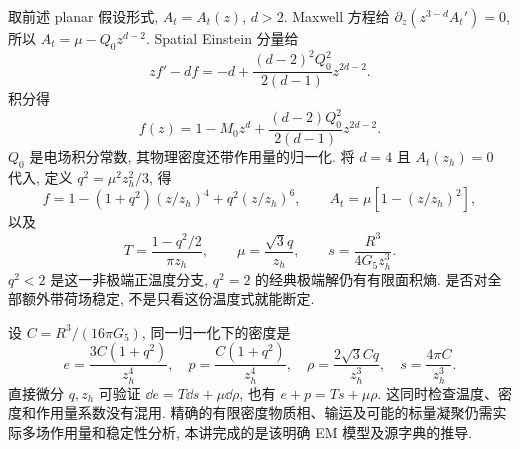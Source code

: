 取前述 planar 假设形式, $A_t=A_t(z)$, $d>2$. Maxwell 方程给 $\partial_z(z^{3-d}A_t')=0$, 所以 $A_t=\mu-Q_0z^{d-2}$. Spatial Einstein 分量给
\[
zf'-df=-d+\frac{(d-2)^2Q_0^2}{2(d-1)}z^{2d-2}.
\]
积分得
\[
f(z)=1-M_0z^d+\frac{(d-2)Q_0^2}{2(d-1)}z^{2d-2}.
\]
$Q_0$ 是电场积分常数, 其物理密度还带作用量的归一化. 将 $d=4$ 且 $A_t(z_h)=0$ 代入, 定义 $q^2=\mu^2z_h^2/3$, 得
\[
f=1-(1+q^2)(z/z_h)^4+q^2(z/z_h)^6,
\qquad A_t=\mu[1-(z/z_h)^2],
\]
以及
\[
T=\frac{1-q^2/2}{\pi z_h},\qquad
\mu=\frac{\sqrt3q}{z_h},\qquad
s=\frac{R^3}{4G_5z_h^3}.
\]
$q^2<2$ 是这一非极端正温度分支, $q^2=2$ 的经典极端解仍有有限面积熵. 是否对全部额外带荷场稳定, 不是只看这份温度式就能断定.

设 $C=R^3/(16\pi G_5)$, 同一归一化下的密度是
\[
e=\frac{3C(1+q^2)}{z_h^4},\quad
p=\frac{C(1+q^2)}{z_h^4},\quad
\rho=\frac{2\sqrt3Cq}{z_h^3},\quad
s=\frac{4\pi C}{z_h^3}.
\]
直接微分 $q,z_h$ 可验证 $\dd e=T\dd s+\mu\dd\rho$, 也有 $e+p=Ts+\mu\rho$. 这同时检查温度、密度和作用量系数没有混用. 精确的有限密度物质相、输运及可能的标量凝聚仍需实际多场作用量和稳定性分析, 本讲完成的是该明确 EM 模型及源字典的推导.
